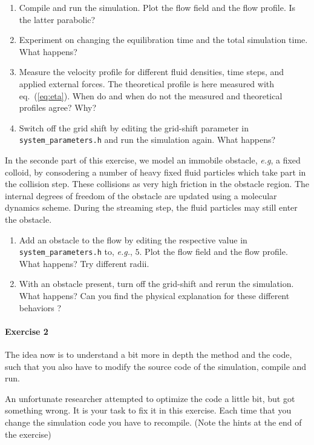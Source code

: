 \documentclass[sizes,12pt,nftimes]{article}
\begin{document}
\begin{enumerate}
\item Compile and run the simulation. Plot the flow field and the flow
  profile. Is the latter parabolic?
\item Experiment on changing the equilibration time and the total
  simulation time. What happens?
\item Measure the velocity profile for different fluid densities, time
  steps, and applied external forces. The theoretical profile is here
  measured with eq.~(\ref{eq:eta}). When do and when do not the
  measured and theoretical profiles agree? Why?
\item Switch off the grid shift by editing the grid-shift parameter in
  \mbox{\texttt{system\_parameters.h}} and run the simulation
  again. What happens?
\end{enumerate}

In the seconde part of this exercise, we model an immobile obstacle,
\emph{e.g}, a fixed colloid, by consodering a number of heavy fixed
fluid particles which take part in the collision step. These
collisions as very high friction in the obstacle region. The internal
degrees of freedom of the obstacle are updated using a molecular
dynamics scheme. During the streaming step, the fluid particles may
still enter the obstacle.

\begin{enumerate} \addtocounter{enumi}{4}
\item Add an obstacle to the flow by editing the respective value in
  \mbox{\texttt{system\_parameters.h}} to, \emph{e.g.}, $5$. Plot the
  flow field and the flow profile. What happens?  Try different radii.
\item With an obstacle present, turn off the grid-shift and rerun the
  simulation. What happens? Can you find the physical explanation
  for these different behaviors ?
\end{enumerate}


\paragraph*{Exercise 2} The idea now is to understand a bit more in depth the
method and the code, such that you also have to modify the source code
of the simulation, compile and run. 
		
An unfortunate researcher attempted to optimize the code a little bit,
but got something wrong. It is your task to fix it in this
exercise. Each time that you change the simulation code you have to
recompile. (Note the hints at the end of the exercise)
		
\end{document}
